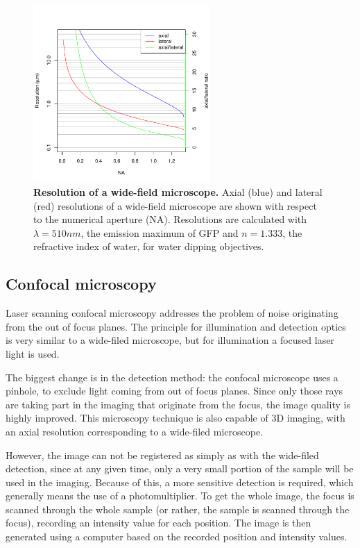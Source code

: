 \documentclass{diploma_style}
\begin{document}
\begin{figure}[htpb]
	\centering
	\includegraphics[width=0.6\textwidth]{figures/1_spim/resolution}
	\caption{\textbf{Resolution of a wide-field microscope.} Axial (blue) and lateral (red) resolutions of a wide-field microscope are shown with respect to the numerical aperture (NA). Resolutions are calculated with $\lambda =510nm$, the emission maximum of GFP and $n=1.333$, the refractive index of water, for water dipping objectives.}
	\label{fig:resolution}
\end{figure}

\subsection{Confocal microscopy}

Laser scanning confocal microscopy \cite{davidovits_photomicrography_1973} addresses the problem of noise originating from the out of focus planes. The principle for illumination and detection optics is very similar to a wide-filed microscope, but for illumination a focused laser light is used.

The biggest change is in the detection method: the confocal microscope uses a pinhole, to exclude light coming from out of focus planes. Since only those rays are taking part in the imaging that originate from the focus, the image quality is highly improved. This microscopy technique is also capable of 3D imaging, with an axial resolution corresponding to a wide-filed microscope.

However, the image can not be registered as simply as with the wide-filed detection, since at any given time, only a very small portion of the sample will be used in the imaging. Because of this, a more sensitive detection is required, which generally means the use of a photomultiplier. To get the whole image, the focus is scanned through the whole sample (or rather, the sample is scanned through the focus), recording an intensity value for each position. The image is then generated using a computer based on the recorded position and intensity values.
\end{document}

